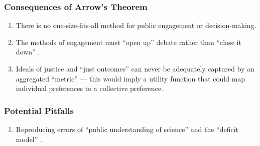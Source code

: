 \begin{frame}
    \frametitle{Consequences of Arrow's Theorem}

    \begin{enumerate}
        \item There is no one-size-fits-all method for public engagement or
        decision-making.
        \item The methods of engagement must ``open up'' debate rather than
        ``close it down'' \cite{wilsdon_see-through_2004,dryzek_deliberative_2013}. 
        \item Ideals of justice and ``just outcomes'' can never be adequately
        captured by an aggregated ``metric'' --- this would imply a utility
        function that could map individual preferences to a collective
        preference.
    \end{enumerate}

\end{frame}

\begin{frame}
    \frametitle{Potential Pitfalls}

    \begin{enumerate}
        \item Reproducing errors of ``public understanding of science'' and the
        ``deficit model'' \cite{wynne_misunderstood_1992,wynne_public_2006}.
    \end{enumerate}

\end{frame}




